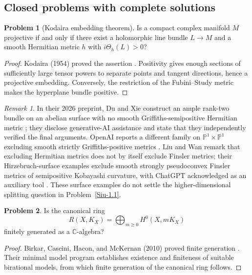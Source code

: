 \documentclass[11pt,reqno]{amsart}
\theoremstyle{definition}
\newtheorem{problem}{Problem}[section]
\theoremstyle{remark}
\newtheorem*{remark}{Remark}
\begin{document}
\subsection{Closed problems with complete solutions}

\begin{problem}[Kodaira embedding theorem]\label{Z-Kodaira}
Is a compact complex manifold $M$ projective if and only if there exist a holomorphic line bundle $L\to M$ and a smooth Hermitian metric $h$ with $i\Theta_h(L)>0$?
\end{problem}
\begin{proof}
Kodaira (1954) proved the assertion \cite{Z-Kodaira1954}. Positivity gives enough sections of sufficiently large tensor powers to separate points and tangent directions, hence a projective embedding. Conversely, the restriction of the Fubini--Study metric makes the hyperplane bundle positive.
\end{proof}
\begin{remark}
In their 2026 preprint, Du and Xie construct an ample rank-two bundle on an abelian surface with no smooth Griffiths-semipositive Hermitian metric \cite[Theorem~1.1]{SIU-DX26}; they disclose generative-AI assistance and state that they independently verified the final arguments. OpenAI reports a different family on $\mathbb P^1\times\mathbb P^1$ excluding smooth strictly Griffiths-positive metrics \cite[Theorem~1.1]{SIU-OAIGriff26}. Liu and Wan remark that excluding Hermitian metrics does not by itself exclude Finsler metrics; their Hirzebruch-surface examples exclude smooth strongly pseudoconvex Finsler metrics of semipositive Kobayashi curvature, with ChatGPT acknowledged as an auxiliary tool \cite[Theorem~1.1 and AI Declaration]{SIU-LWGriff26}. These surface examples do not settle the higher-dimensional splitting question in Problem~\ref{Siu-1.1}.
\end{remark}

\begin{problem}\label{Siu-1.4-fg}
Is the canonical ring
\[
R(X,K_X)=\bigoplus_{m\geq0}H^0(X,mK_X)
\]
finitely generated as a $\mathbb C$-algebra?
\end{problem}
\begin{proof}
Birkar, Cascini, Hacon, and McKernan (2010) proved finite generation \cite{SIU-BCHM10}. Their minimal model program establishes existence and finiteness of suitable birational models, from which finite generation of the canonical ring follows.
\end{proof}
\end{document}
